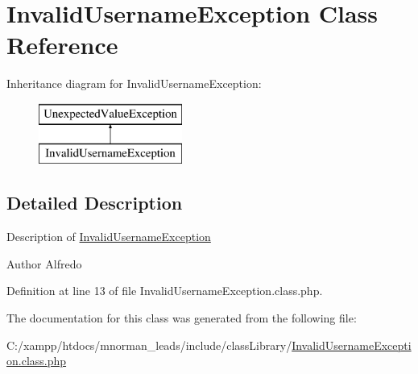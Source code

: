 \hypertarget{class_invalid_username_exception}{\section{Invalid\-Username\-Exception Class Reference}
\label{class_invalid_username_exception}
}
Inheritance diagram for Invalid\-Username\-Exception\-:\begin{figure}[H]
\begin{center}
\leavevmode
\includegraphics[height=2.000000cm]{class_invalid_username_exception}
\end{center}
\end{figure}


\subsection{Detailed Description}
Description of \hyperlink{class_invalid_username_exception}{Invalid\-Username\-Exception}

\begin{DoxyAuthor}{Author}
Alfredo 
\end{DoxyAuthor}


Definition at line 13 of file Invalid\-Username\-Exception.\-class.\-php.



The documentation for this class was generated from the following file\-:\begin{DoxyCompactItemize}
\item 
C\-:/xampp/htdocs/mnorman\-\_\-leads/include/class\-Library/\hyperlink{_invalid_username_exception_8class_8php}{Invalid\-Username\-Exception.\-class.\-php}\end{DoxyCompactItemize}
